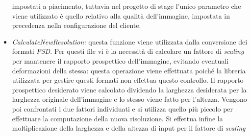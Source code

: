 \begin{itemize}
          impostati a piacimento, tuttavia nel progetto di stage l'unico parametro che viene
          utilizzato è quello relativo alla qualità dell'immagine, impostata in
          precedenza nella configurazione del cliente.
    \item \emph{CalculateNewResolution:} questa funzione viene utilizzata dalla
          conversione dei formati \emph{PSD}. Per questi file vi è la necessità di
          calcolare un fattore di \emph{scaling} per mantenere il rapporto prospettico
          dell'immagine, evitando eventuali deformazioni della stessa: questa operazione
          viene effettuata poiché la libreria utilizzata per gestire questi formati
          non effettua questo controllo.
          Il rapporto prospettico desiderato viene calcolato dividendo la larghezza desiderata per la larghezza originale
          dell'immagine e lo stesso viene fatto per l'altezza. Vengono poi confrontati
          i due fattori individuati e si utilizza quello più piccolo per effettuare la
          computazione della nuova risoluzione. Si effettua infine la moltiplicazione
          della larghezza e della altezza di input per il fattore di \emph{scaling}
\end{itemize}
